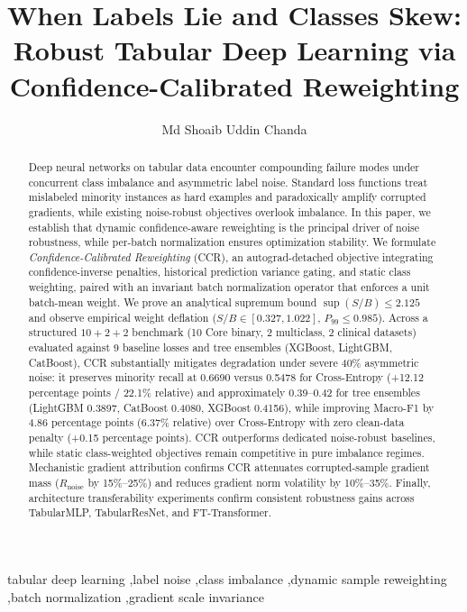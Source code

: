 \documentclass[preprint,12pt]{elsarticle}
\begin{document}
\begin{frontmatter}

\title{When Labels Lie and Classes Skew: Robust Tabular Deep Learning via Confidence-Calibrated Reweighting}

\author[aff1]{Md Shoaib Uddin Chanda}

\address[aff1]{Department of Computer Science and Engineering
  (Artificial Intelligence and Machine Learning),
  Lords Institute of Engineering and Technology,
  Hyderabad 500091, Telangana, India
  (Affiliated with Osmania University, Hyderabad).}

\begin{abstract}
Deep neural networks on tabular data encounter compounding failure modes under concurrent class imbalance and asymmetric label noise. Standard loss functions treat mislabeled minority instances as hard examples and paradoxically amplify corrupted gradients, while existing noise-robust objectives overlook imbalance. In this paper, we establish that dynamic confidence-aware reweighting is the principal driver of noise robustness, while per-batch normalization ensures optimization stability. We formulate \emph{Confidence-Calibrated Reweighting} (CCR), an autograd-detached objective integrating confidence-inverse penalties, historical prediction variance gating, and static class weighting, paired with an invariant batch normalization operator that enforces a unit batch-mean weight. We prove an analytical supremum bound $\sup(S/B) \le 2.125$ and observe empirical weight deflation ($S/B \in [0.327, 1.022]$, $P_{99} \le 0.985$). Across a structured $10+2+2$ benchmark (10 Core binary, 2 multiclass, 2 clinical datasets) evaluated against 9 baseline losses and tree ensembles (XGBoost, LightGBM, CatBoost), CCR substantially mitigates degradation under severe 40\% asymmetric noise: it preserves minority recall at 0.6690 versus 0.5478 for Cross-Entropy (+12.12 percentage points / 22.1\% relative) and approximately 0.39--0.42 for tree ensembles (LightGBM 0.3897, CatBoost 0.4080, XGBoost 0.4156), while improving Macro-F1 by 4.86 percentage points (6.37\% relative) over Cross-Entropy with zero clean-data penalty (+0.15 percentage points). CCR outperforms dedicated noise-robust baselines, while static class-weighted objectives remain competitive in pure imbalance regimes. Mechanistic gradient attribution confirms CCR attenuates corrupted-sample gradient mass ($R_{\mathrm{noise}}$ by 15\%--25\%) and reduces gradient norm volatility by 10\%--35\%. Finally, architecture transferability experiments confirm consistent robustness gains across TabularMLP, TabularResNet, and FT-Transformer.
\end{abstract}

\begin{keyword}
tabular deep learning \sep label noise \sep class imbalance \sep dynamic sample reweighting \sep batch normalization \sep gradient scale invariance
\end{keyword}

\end{frontmatter}
\end{document}
